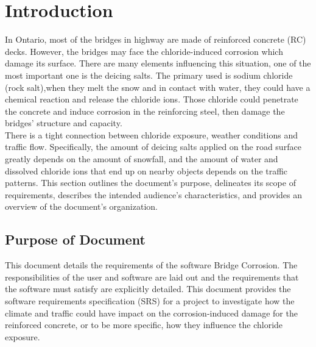 \documentclass[12pt]{article}
\begin{document}

\section{Introduction}
In Ontario, most of the bridges in highway are made of reinforced concrete (RC) decks. However, the bridges may face the chloride-induced corrosion which damage its surface. There are many elements influencing this situation, one of the most important one is the deicing salts. The primary used is sodium chloride (rock salt),when they melt the snow and in contact with water, they could have a chemical reaction and release the chloride ions. Those chloride could penetrate the concrete and induce corrosion in the reinforcing steel, then damage the bridges’ structure and capacity. \\
There is a tight connection between chloride exposure, weather conditions and traffic flow. Specifically, the amount of deicing salts applied on the road surface greatly depends on the amount of snowfall, and the amount of water and dissolved chloride ions that end up on nearby objects depends on the traffic patterns. This section outlines the document's purpose, delineates its scope of requirements, describes the intended audience's characteristics, and provides an overview of the document's organization.


\subsection{Purpose of Document}
This document details the requirements of the software Bridge Corrosion. The
responsibilities of the user and software are laid out and the requirements that the software must satisfy are explicitly detailed. This document provides the software requirements specification (SRS) for a project to investigate how the climate and traffic could have impact on the corrosion-induced damage for the reinforced concrete, or to be more specific, how they influence the chloride exposure. 
\end{document}
